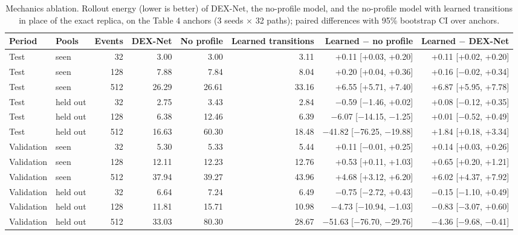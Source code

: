 \documentclass[11pt]{article}
\begin{document}
\begin{table}[t]
\centering
\caption{Mechanics ablation. Rollout energy (lower is better) of DEX-Net, the no-profile model, and the no-profile model with learned transitions in place of the exact replica, on the Table 4 anchors (3 seeds \ensuremath{\times} 32 paths); paired differences with 95\% bootstrap CI over anchors.}\label{tab:8}
\begin{adjustbox}{max width=\linewidth}
\begin{tabular}{llrrrrrr}
\toprule
Period & Pools & Events & DEX-Net & No profile & Learned transitions & Learned \ensuremath{-} no profile & Learned \ensuremath{-} DEX-Net \\
\midrule
Test & seen & 32 & 3.00 & 3.00 & 3.11 & +0.11 [+0.03, +0.20] & +0.11 [+0.02, +0.20] \\
Test & seen & 128 & 7.88 & 7.84 & 8.04 & +0.20 [+0.04, +0.36] & +0.16 [\ensuremath{-}0.02, +0.34] \\
Test & seen & 512 & 26.29 & 26.61 & 33.16 & +6.55 [+5.71, +7.40] & +6.87 [+5.95, +7.78] \\
\midrule
Test & held out & 32 & 2.75 & 3.43 & 2.84 & \ensuremath{-}0.59 [\ensuremath{-}1.46, +0.02] & +0.08 [\ensuremath{-}0.12, +0.35] \\
Test & held out & 128 & 6.38 & 12.46 & 6.39 & \ensuremath{-}6.07 [\ensuremath{-}14.15, \ensuremath{-}1.25] & +0.01 [\ensuremath{-}0.52, +0.49] \\
Test & held out & 512 & 16.63 & 60.30 & 18.48 & \ensuremath{-}41.82 [\ensuremath{-}76.25, \ensuremath{-}19.88] & +1.84 [+0.18, +3.34] \\
\midrule
Validation & seen & 32 & 5.30 & 5.33 & 5.44 & +0.11 [\ensuremath{-}0.01, +0.25] & +0.14 [+0.03, +0.26] \\
Validation & seen & 128 & 12.11 & 12.23 & 12.76 & +0.53 [+0.11, +1.03] & +0.65 [+0.20, +1.21] \\
Validation & seen & 512 & 37.94 & 39.27 & 43.96 & +4.68 [+3.12, +6.20] & +6.02 [+4.37, +7.92] \\
\midrule
Validation & held out & 32 & 6.64 & 7.24 & 6.49 & \ensuremath{-}0.75 [\ensuremath{-}2.72, +0.43] & \ensuremath{-}0.15 [\ensuremath{-}1.10, +0.49] \\
Validation & held out & 128 & 11.81 & 15.71 & 10.98 & \ensuremath{-}4.73 [\ensuremath{-}10.94, \ensuremath{-}1.03] & \ensuremath{-}0.83 [\ensuremath{-}3.07, +0.60] \\
Validation & held out & 512 & 33.03 & 80.30 & 28.67 & \ensuremath{-}51.63 [\ensuremath{-}76.70, \ensuremath{-}29.76] & \ensuremath{-}4.36 [\ensuremath{-}9.68, \ensuremath{-}0.41] \\
\bottomrule
\end{tabular}
\end{adjustbox}
\end{table}
\end{document}
